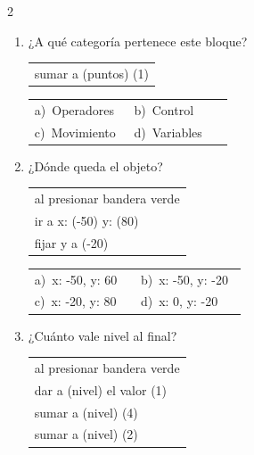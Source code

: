 \documentclass[11pt,a4paper]{article}
\begin{document}
\begin{multicols}{2}
\begin{enumerate}[label=\textbf{\arabic*.},leftmargin=*,itemsep=10pt,topsep=0pt]
\item \begin{minipage}[t]{\linewidth}
¿A qué categoría pertenece este bloque?
\par\vspace{3pt}\hspace*{1em}\begin{tabular}{@{}l@{}}\ttfamily\small sumar a (puntos) (1)
\end{tabular}\par

\vspace{4pt}
\begin{tabular}{@{}>{\raggedright\arraybackslash}p{0.47\linewidth}>{\raggedright\arraybackslash}p{0.47\linewidth}@{}}
a)~Operadores & b)~Control \\
c)~Movimiento & d)~Variables \\
\end{tabular}
\end{minipage}

\item \begin{minipage}[t]{\linewidth}
¿Dónde queda el objeto?
\par\vspace{3pt}\hspace*{1em}\begin{tabular}{@{}l@{}}\ttfamily\small al presionar bandera verde \\
\ttfamily\small ir a x: (-50) y: (80) \\
\ttfamily\small fijar y a (-20)
\end{tabular}\par

\vspace{4pt}
\begin{tabular}{@{}>{\raggedright\arraybackslash}p{0.47\linewidth}>{\raggedright\arraybackslash}p{0.47\linewidth}@{}}
a)~x: -50, y: 60 & b)~x: -50, y: -20 \\
c)~x: -20, y: 80 & d)~x: 0, y: -20 \\
\end{tabular}
\end{minipage}

\item \begin{minipage}[t]{\linewidth}
¿Cuánto vale nivel al final?
\par\vspace{3pt}\hspace*{1em}\begin{tabular}{@{}l@{}}\ttfamily\small al presionar bandera verde \\
\ttfamily\small dar a (nivel) el valor (1) \\
\ttfamily\small sumar a (nivel) (4) \\
\ttfamily\small sumar a (nivel) (2)
\end{tabular}\par


\end{minipage}
\end{enumerate}
\end{multicols}
\end{document}
